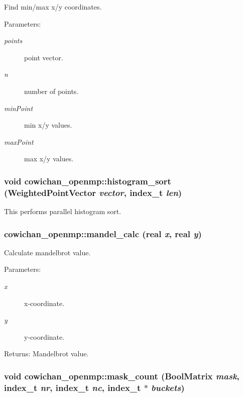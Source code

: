 Find min/max x/y coordinates. \begin{Desc}
\item[Parameters:]
\begin{description}
\item[{\em points}]point vector. \item[{\em n}]number of points. \item[{\em minPoint}]min x/y values. \item[{\em maxPoint}]max x/y values. \end{description}
\end{Desc}
\hypertarget{namespacecowichan__openmp_9cbb3540b84f4e051f072a08c2c1d5db}{
\subsubsection[{histogram\_\-sort}]{\setlength{\rightskip}{0pt plus 5cm}void cowichan\_\-openmp::histogram\_\-sort ({\bf WeightedPointVector} {\em vector}, \/  {\bf index\_\-t} {\em len})}}
\label{namespacecowichan__openmp_9cbb3540b84f4e051f072a08c2c1d5db}


This performs parallel histogram sort. \hypertarget{namespacecowichan__openmp_2753e3856bc41c61099c4702d789823e}{
\subsubsection[{mandel\_\-calc}]{ cowichan\_\-openmp::mandel\_\-calc ({\bf real} {\em x}, \/  {\bf real} {\em y})}}
\label{namespacecowichan__openmp_2753e3856bc41c61099c4702d789823e}


Calculate mandelbrot value. \begin{Desc}
\item[Parameters:]
\begin{description}
\item[{\em x}]x-coordinate. \item[{\em y}]y-coordinate. \end{description}
\end{Desc}
\begin{Desc}
\item[Returns:]Mandelbrot value. \end{Desc}
\hypertarget{namespacecowichan__openmp_9c68e88badede2262dd4ded923e804dc}{
\subsubsection[{mask\_\-count}]{\setlength{\rightskip}{0pt plus 5cm}void cowichan\_\-openmp::mask\_\-count ({\bf BoolMatrix} {\em mask}, \/  {\bf index\_\-t} {\em nr}, \/  {\bf index\_\-t} {\em nc}, \/  {\bf index\_\-t} $\ast$ {\em buckets})}}
\label{namespacecowichan__openmp_9c68e88badede2262dd4ded923e804dc}


